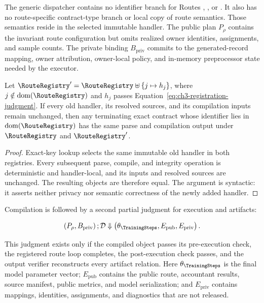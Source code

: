 The generic dispatcher contains no identifier branch for Routes \RouteP, \RouteF,
or \RouteA.  It also has no route-specific contract-type branch or local copy of
route semantics.
Those semantics reside in the selected immutable handler.  The public plan
\(P_{\rho}\) contains the invariant route configuration but omits realized owner
identities, assignments, and sample counts.  The private binding
\(B_{\mathrm{priv}}\) commits to the generated-record mapping, owner attribution,
owner-local policy, and in-memory preprocessor state needed by the executor.

\begin{lemma}
\label{lem:ch3-conservative-extension}
Let
\(\RouteRegistry'=\RouteRegistry\uplus\{j\mapsto h_j\}\), where
\(j\notin\operatorname{dom}(\RouteRegistry)\) and \(h_j\) passes
Equation~\eqref{eq:ch3-registration-judgment}.  If every old handler, its resolved
sources, and its compilation inputs remain unchanged, then any terminating exact
contract whose identifier lies in \(\operatorname{dom}(\RouteRegistry)\) has the
same parse and compilation output under \(\RouteRegistry\) and
\(\RouteRegistry'\).
\end{lemma}

\begin{proof}
Exact-key lookup selects the same immutable old handler in both registries.
Every subsequent parse, compile, and integrity operation is deterministic and
handler-local, and its inputs and resolved sources are unchanged.  The resulting
objects are therefore equal.  The argument is syntactic: it asserts neither
privacy nor semantic correctness of the newly added handler.
\end{proof}

Compilation is followed by a second partial judgment for execution and artifacts:

\begin{equation}
    \left(P_{\rho},B_{\mathrm{priv}}\right);
    \mathcal D
    \Downarrow
    \left(
        \theta_{\TrainingSteps},
        E_{\mathrm{pub}},
        E_{\mathrm{priv}}
    \right).
\label{eq:ch3-execution-judgment}
\end{equation}

This judgment exists only if the compiled object passes its pre-execution check,
the registered route loop completes, the post-execution check passes, and the
output verifier reconstructs every artifact relation.  Here
\(\theta_{\TrainingSteps}\) is the final model parameter vector;
\(E_{\mathrm{pub}}\) contains the public route, accountant results, source
manifest, public metrics, and model serialization; and \(E_{\mathrm{priv}}\)
contains mappings, identities, assignments, and diagnostics that are not
released.

